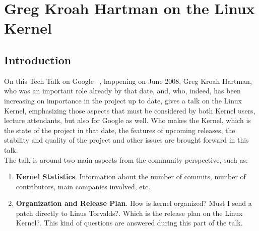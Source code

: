 \documentclass[11pt]{article}
\begin{document}
\pagebreak

\section{Greg Kroah Hartman on the Linux Kernel}
\label{sec:linuxkernel}
\subsection{Introduction}
On this Tech Talk on Google ~\cite{TALK04}, happening on June 2008, Greg Kroah Hartman, who was an important role already by that date, and, who, indeed, has been increasing on importance in the project up to date, gives a talk on the Linux Kernel, emphasizing those aspects that must be considered by both Kernel users, lecture attendants, but also for Google as well. Who makes the Kernel, which is the state of the project in that date, the features of upcoming releases, the stability and quality of the project and other issues are brought forward in this talk.\\
The talk is around two main aspects from the community perspective, such as:
\begin{enumerate}
\item{\textbf{Kernel Statistics}}. Information about the number of commits, number of contributors, main companies involved, etc. 
\item{\textbf{Organization and Release Plan}}. How is kernel organized? Must I send a patch directly to Linus Torvalds?. Which is the release plan on the Linux Kernel?. This kind of questions are answered during this part of the talk.
\end{enumerate}
\end{document}
